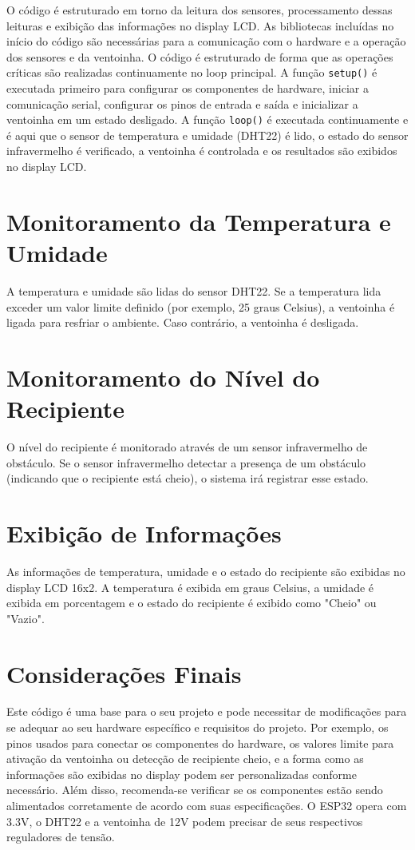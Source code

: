 \documentclass{article}
\begin{document}
O código é estruturado em torno da leitura dos sensores, processamento dessas leituras e exibição das informações no display LCD.
As bibliotecas incluídas no início do código são necessárias para a comunicação com o hardware e a operação dos sensores e da ventoinha. O código é estruturado de forma que as operações críticas são realizadas continuamente no loop principal.
A função \verb|setup()| é executada primeiro para configurar os componentes de hardware, iniciar a comunicação serial, configurar os pinos de entrada e saída e inicializar a ventoinha em um estado desligado.
A função \verb|loop()| é executada continuamente e é aqui que o sensor de temperatura e umidade (DHT22) é lido, o estado do sensor infravermelho é verificado, a ventoinha é controlada e os resultados são exibidos no display LCD.
\section{Monitoramento da Temperatura e Umidade}
A temperatura e umidade são lidas do sensor DHT22. Se a temperatura lida exceder um valor limite definido (por exemplo, 25 graus Celsius), a ventoinha é ligada para resfriar o ambiente. Caso contrário, a ventoinha é desligada.
\section{Monitoramento do Nível do Recipiente}
O nível do recipiente é monitorado através de um sensor infravermelho de obstáculo. Se o sensor infravermelho detectar a presença de um obstáculo (indicando que o recipiente está cheio), o sistema irá registrar esse estado.
\section{Exibição de Informações}
As informações de temperatura, umidade e o estado do recipiente são exibidas no display LCD 16x2. A temperatura é exibida em graus Celsius, a umidade é exibida em porcentagem e o estado do recipiente é exibido como "Cheio" ou "Vazio".
\section{Considerações Finais}
Este código é uma base para o seu projeto e pode necessitar de modificações para se adequar ao seu hardware específico e requisitos do projeto. Por exemplo, os pinos usados para conectar os componentes do hardware, os valores limite para ativação da ventoinha ou detecção de recipiente cheio, e a forma como as informações são exibidas no display podem ser personalizadas conforme necessário. Além disso, recomenda-se verificar se os componentes estão sendo alimentados corretamente de acordo com suas especificações. O ESP32 opera com 3.3V, o DHT22 e a ventoinha de 12V podem precisar de seus respectivos reguladores de tensão.
\end{document}

